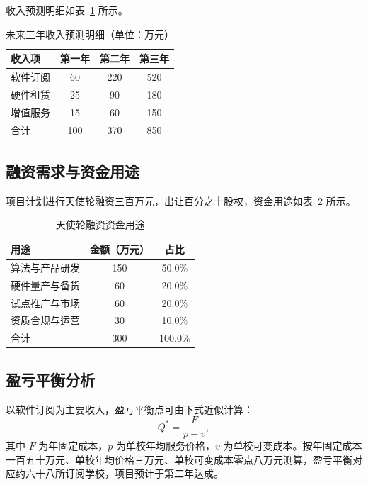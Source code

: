 \documentclass[zihao=-4,fontset=windows,a4paper]{ctexart}
\begin{document}
收入预测明细如表~\ref{tab:revenue} 所示。

\begin{table}[H]
\centering
\caption{未来三年收入预测明细（单位：万元）}
\label{tab:revenue}
\begin{tabular}{lccc}
\toprule
\textbf{收入项} & \textbf{第一年} & \textbf{第二年} & \textbf{第三年} \\
\midrule
软件订阅 & 60 & 220 & 520 \\
硬件租赁 & 25 & 90 & 180 \\
增值服务 & 15 & 60 & 150 \\
\midrule
合计 & 100 & 370 & 850 \\
\bottomrule
\end{tabular}
\end{table}

\subsection{融资需求与资金用途}

项目计划进行天使轮融资三百万元，出让百分之十股权，资金用途如表~\ref{tab:fund} 所示。

\begin{table}[H]
\centering
\caption{天使轮融资资金用途}
\label{tab:fund}
\begin{tabular}{lcc}
\toprule
\textbf{用途} & \textbf{金额（万元）} & \textbf{占比} \\
\midrule
算法与产品研发 & 150 & 50.0\% \\
硬件量产与备货 & 60 & 20.0\% \\
试点推广与市场 & 60 & 20.0\% \\
资质合规与运营 & 30 & 10.0\% \\
\midrule
合计 & 300 & 100.0\% \\
\bottomrule
\end{tabular}
\end{table}

\subsection{盈亏平衡分析}

以软件订阅为主要收入，盈亏平衡点可由下式近似计算：
\begin{equation}
Q^{*} = \frac{F}{p-v},
\label{eq:breakeven}
\end{equation}
其中 $F$ 为年固定成本，$p$ 为单校年均服务价格，$v$ 为单校可变成本。按年固定成本一百五十万元、单校年均价格三万元、单校可变成本零点八万元测算，盈亏平衡对应约六十八所订阅学校，项目预计于第二年达成。
\end{document}
